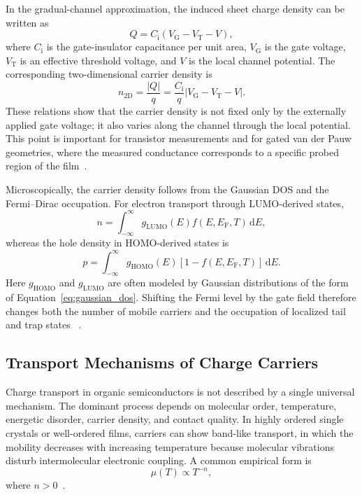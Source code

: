 In the gradual-channel approximation, the induced sheet charge density can be
written as
\begin{equation}
    Q = C_\mathrm{i}\left(V_\mathrm{G}-V_\mathrm{T}-V\right),
    \label{eq:gate_charge}
\end{equation}
where $C_\mathrm{i}$ is the gate-insulator capacitance per unit area,
$V_\mathrm{G}$ is the gate voltage, $V_\mathrm{T}$ is an effective threshold
voltage, and $V$ is the local channel potential. The corresponding two-dimensional
carrier density is
\begin{equation}
    n_\mathrm{2D} = \frac{|Q|}{q}
    = \frac{C_\mathrm{i}}{q}\left|V_\mathrm{G}-V_\mathrm{T}-V\right| .
    \label{eq:carrier_density_2d}
\end{equation}
These relations show that the carrier density is not fixed only by the externally
applied gate voltage; it also varies along the channel through the local
potential. This point is important for transistor measurements and for gated van
der Pauw geometries, where the measured conductance corresponds to a specific
probed region of the film~\cite{Sirringhaus2005DevicePhysics,Rolin2017GVDP}.

Microscopically, the carrier density follows from the Gaussian DOS and the
Fermi--Dirac occupation. For electron transport through LUMO-derived states,
\begin{equation}
    n = \int_{-\infty}^{\infty} g_\mathrm{LUMO}(E)
    f(E,E_\mathrm{F},T)\,\mathrm{d}E,
\end{equation}
whereas the hole density in HOMO-derived states is
\begin{equation}
    p = \int_{-\infty}^{\infty} g_\mathrm{HOMO}(E)
    \left[1-f(E,E_\mathrm{F},T)\right]\,\mathrm{d}E .
\end{equation}
Here $g_\mathrm{HOMO}$ and $g_\mathrm{LUMO}$ are often modeled by Gaussian
distributions of the form of Equation~\ref{eq:gaussian_dos}. Shifting the Fermi
level by the gate field therefore changes both the number of mobile carriers and
the occupation of localized tail and trap states
~\cite{Stodtmann2012OrganicSimulation,Darwish2020DriftDiffusionOFET}.

\subsection{Transport Mechanisms of Charge Carriers}
\label{subsec:charge_carrier_transport_mechanisms}

Charge transport in organic semiconductors is not described by a single universal
mechanism. The dominant process depends on molecular order, temperature,
energetic disorder, carrier density, and contact quality. In highly ordered
single crystals or well-ordered films, carriers can show band-like transport, in
which the mobility decreases with increasing temperature because molecular
vibrations disturb intermolecular electronic coupling. A common empirical form is
\begin{equation}
    \mu(T) \propto T^{-n},
\end{equation}
where $n>0$~\cite{Sakanoue2010BandLikeMobility,Coropceanu2007ChargeTransport}.

